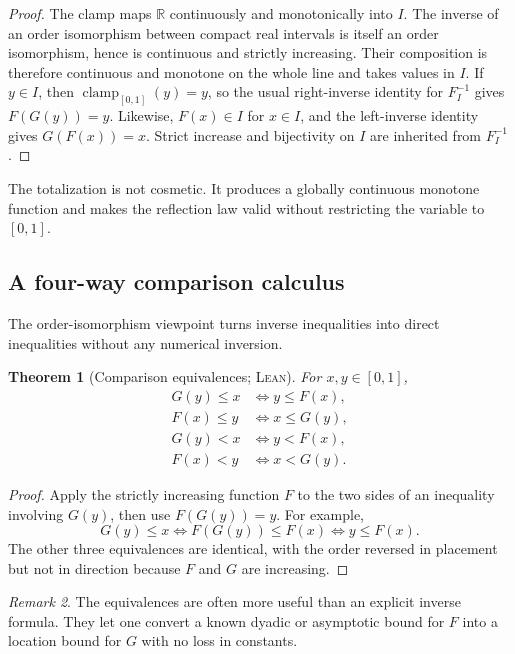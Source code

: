 \documentclass[11pt,oneside]{article}
\newtheorem{theorem}{Theorem}[section]
\theoremstyle{definition}
\theoremstyle{remark}
\newtheorem{remark}[theorem]{Remark}
\newcommand{\R}{\mathbb R}
\newcommand{\InvF}{G}
\newcommand{\clamp}{\operatorname{clamp}_{[0,1]}}
\newcommand{\Formalized}{\textsc{Lean}}
\begin{document}
\begin{proof}
The clamp maps $\R$ continuously and monotonically into $I$.  The inverse
of an order isomorphism between compact real intervals is itself an order
isomorphism, hence is continuous and strictly increasing.  Their
composition is therefore continuous and monotone on the whole line and
takes values in $I$.  If $y\in I$, then $\clamp(y)=y$, so the usual
right-inverse identity for $F_I^{-1}$ gives $F(\InvF(y))=y$.  Likewise,
$F(x)\in I$ for $x\in I$, and the left-inverse identity gives
$\InvF(F(x))=x$.  Strict increase and bijectivity on $I$ are inherited
from $F_I^{-1}$.
\end{proof}

The totalization is not cosmetic.  It produces a globally continuous
monotone function and makes the reflection law valid without restricting
the variable to $[0,1]$.

\subsection{A four-way comparison calculus}

The order-isomorphism viewpoint turns inverse inequalities into direct
inequalities without any numerical inversion.

\begin{theorem}[Comparison equivalences; \Formalized]
\label{thm:inverse-comparisons}
For $x,y\in[0,1]$,
\begin{align}
 \InvF(y)\leq x&\iff y\leq F(x), \label{eq:inv-le}\\
 F(x)\leq y&\iff x\leq \InvF(y), \label{eq:F-le}\\
 \InvF(y)<x&\iff y<F(x), \label{eq:inv-lt}\\
 F(x)<y&\iff x<\InvF(y). \label{eq:F-lt}
\end{align}
\end{theorem}

\begin{proof}
Apply the strictly increasing function $F$ to the two sides of an
inequality involving $\InvF(y)$, then use $F(\InvF(y))=y$.  For example,
\[
 \InvF(y)\leq x
 \iff F(\InvF(y))\leq F(x)
 \iff y\leq F(x).
\]
The other three equivalences are identical, with the order reversed in
placement but not in direction because $F$ and $\InvF$ are increasing.
\end{proof}

\begin{remark}
The equivalences are often more useful than an explicit inverse formula.
They let one convert a known dyadic or asymptotic bound for $F$ into a
location bound for $\InvF$ with no loss in constants.
\end{remark}
\end{document}
